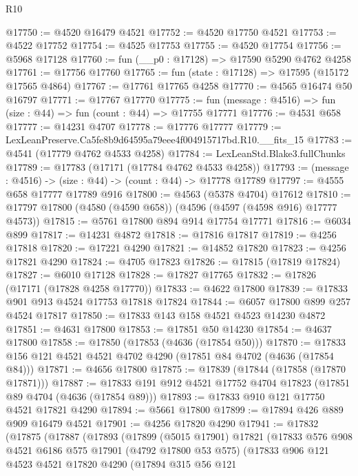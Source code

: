 \begin{lexlean}{R10}
\begin{coremodule}
@17750 := @4520 @16479 @4521
@17752 := @4520 @17750 @4521
@17753 := @4522 @17752
@17754 := @4525 @17753
@17755 := @4520 @17754
@17756 := @5968 @17128
@17760 := fun (__p0 : @17128) => @17590 @5290 @4762 @4258
@17761 := @17756 @17760
@17765 := fun (state : @17128) => @17595 (@15172 @17565 @4864)
@17767 := @17761 @17765 @4258
@17770 := @4565 @16474 @50 @16797
@17771 := @17767 @17770
@17775 := fun (message : @4516) => fun (size : @44) => fun (count : @44) => @17755 @17771
@17776 := @4531 @658
@17777 := @14231 @4707
@17778 := @17776 @17777
@17779 := LexLeanPreserve.Ca5fe8b9d64595a79eee4f004915717bd.R10.__fits_15
@17783 := @4541 (@17779 @4762 @4533 @4258)
@17784 := LexLeanStd.Blake3.fullChunks
@17789 := @17783 (@17171 (@17784 @4762 @4533 @4258))
@17793 := (message : @4516) -> (size : @44) -> (count : @44) -> @17778 @17789
@17797 := @4555 @658 @17777 @17789 @916
@17800 := @4563 (@5378 @4704) @17612
@17810 := @17797 @17800 (@4580 (@4590 @658)) (@4596 (@4597 (@4598 @916) @17777 @4573))
@17815 := @5761 @17800 @894 @914 @17754 @17771
@17816 := @6034 @899
@17817 := @14231 @4872
@17818 := @17816 @17817
@17819 := @4256 @17818
@17820 := @17221 @4290
@17821 := @14852 @17820
@17823 := @4256 @17821 @4290
@17824 := @4705 @17823
@17826 := @17815 (@17819 @17824)
@17827 := @6010 @17128
@17828 := @17827 @17765
@17832 := @17826 (@17171 (@17828 @4258 @17770))
@17833 := @4622 @17800
@17839 := @17833 @901 @913 @4524 @17753 @17818 @17824
@17844 := @6057 @17800 @899 @257 @4524 @17817
@17850 := @17833 @143 @158 @4521 @4523 @14230 @4872
@17851 := @4631 @17800
@17853 := @17851 @50 @14230
@17854 := @4637 @17800
@17858 := @17850 (@17853 (@4636 (@17854 @50)))
@17870 := @17833 @156 @121 @4521 @4521 @4702 @4290 (@17851 @84 @4702 (@4636 (@17854 @84)))
@17871 := @4656 @17800
@17875 := @17839 (@17844 (@17858 (@17870 @17871)))
@17887 := @17833 @191 @912 @4521 @17752 @4704 @17823 (@17851 @89 @4704 (@4636 (@17854 @89)))
@17893 := @17833 @910 @121 @17750 @4521 @17821 @4290
@17894 := @5661 @17800
@17899 := @17894 @426 @889 @909 @16479 @4521
@17901 := @4256 @17820 @4290
@17941 := @17832
    (@17875
      (@17887
        (@17893
          (@17899
            (@5015 @17901)
            @17821
            (@17833
              @576
              @908
              @4521
              @6186
              @575
              @17901
              (@4792 @17800 @53 @575)
              (@17833
                @906
                @121
                @4523
                @4521
                @17820
                @4290
                (@17894
                  @315
                  @56
                  @121

\end{coremodule}
\end{lexlean}
